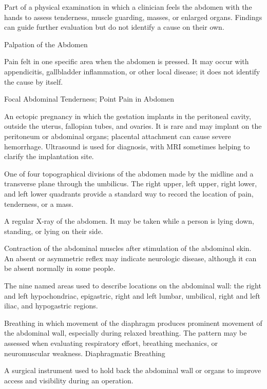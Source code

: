  Part of a physical examination in which a clinician feels the abdomen with the hands to assess tenderness, muscle guarding, masses, or enlarged organs. Findings can guide further evaluation but do not identify a cause on their own.

\synonyms
Palpation of the Abdomen

 Pain felt in one specific area when the abdomen is pressed. It may occur with appendicitis, gallbladder inflammation, or other local disease; it does not identify the cause by itself.

\synonyms
Focal Abdominal Tenderness; Point Pain in Abdomen

 An ectopic pregnancy in which the gestation implants in the peritoneal cavity, outside the uterus, fallopian tubes, and ovaries. It is rare and may implant on the peritoneum or abdominal organs; placental attachment can cause severe hemorrhage. Ultrasound is used for diagnosis, with MRI sometimes helping to clarify the implantation site.

 One of four topographical divisions of the abdomen made by the midline and a transverse plane through the umbilicus. The right upper, left upper, right lower, and left lower quadrants provide a standard way to record the location of pain, tenderness, or a mass.

 A regular X-ray of the abdomen. It may be taken while a person is lying down, standing, or lying on their side.

 Contraction of the abdominal muscles after stimulation of the abdominal skin. An absent or asymmetric reflex may
indicate neurologic disease, although it can be absent normally in some people.

 The nine named areas used to describe locations on the abdominal wall: the right and left hypochondriac, epigastric, right and left lumbar, umbilical, right and left iliac, and hypogastric regions.

 Breathing in which movement of the diaphragm produces prominent movement of the abdominal wall, especially during relaxed breathing. The pattern may be assessed when evaluating respiratory effort, breathing mechanics, or neuromuscular weakness.
\synonyms
Diaphragmatic Breathing

 A surgical instrument used to hold back the abdominal wall or organs to improve access and visibility during an operation.

